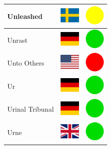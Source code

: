 \documentclass[12pt, a4paper, twoside]{report}
\begin{document}
\begin{center}
\begin{longtable}{|p{5cm}|p{2cm}|p{2cm}|}
 Unleashed                                                  & \includegraphics[width=1cm]{../4x3/se} &   \includegraphics[width=1cm]{../likes/m} \\ \hline
 Unrast                                                     & \includegraphics[width=1cm]{../4x3/de} &   \includegraphics[width=1cm]{../likes/y} \\ \hline
 Unto Others                                                & \includegraphics[width=1cm]{../4x3/us} &   \includegraphics[width=1cm]{../likes/n} \\ \hline
 Ur                                                         & \includegraphics[width=1cm]{../4x3/de} &   \includegraphics[width=1cm]{../likes/y} \\ \hline
 Urinal Tribunal                                            & \includegraphics[width=1cm]{../4x3/de} &   \includegraphics[width=1cm]{../likes/y} \\ \hline
 Urne                                                       & \includegraphics[width=1cm]{../4x3/gb} &   \includegraphics[width=1cm]{../likes/y} \\ \hline

\end{longtable}
\end{center}
\end{document}
